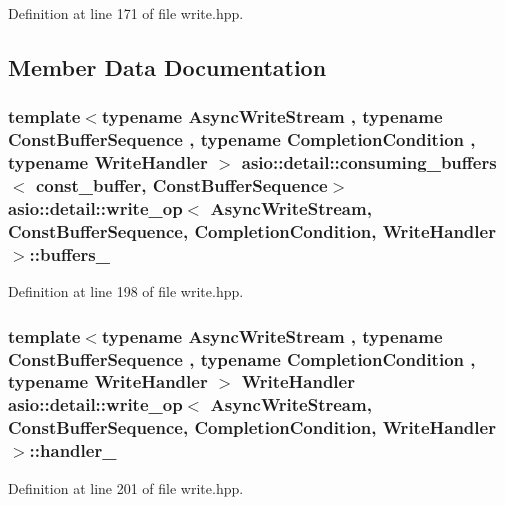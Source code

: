 Definition at line 171 of file write.\+hpp.



\subsection{Member Data Documentation}
\hypertarget{classasio_1_1detail_1_1write__op_a07e6662f88ca192db1446eebbcb77e3e}{}
\subsubsection[{buffers\+\_\+}]{\setlength{\rightskip}{0pt plus 5cm}template$<$typename Async\+Write\+Stream , typename Const\+Buffer\+Sequence , typename Completion\+Condition , typename Write\+Handler $>$ {\bf asio\+::detail\+::consuming\+\_\+buffers}$<$ {\bf const\+\_\+buffer}, Const\+Buffer\+Sequence$>$ {\bf asio\+::detail\+::write\+\_\+op}$<$ Async\+Write\+Stream, Const\+Buffer\+Sequence, Completion\+Condition, Write\+Handler $>$\+::buffers\+\_\+}\label{classasio_1_1detail_1_1write__op_a07e6662f88ca192db1446eebbcb77e3e}


Definition at line 198 of file write.\+hpp.

\hypertarget{classasio_1_1detail_1_1write__op_ae1b7226fd1d411ac3a126ca7698a81d9}{}
\subsubsection[{handler\+\_\+}]{\setlength{\rightskip}{0pt plus 5cm}template$<$typename Async\+Write\+Stream , typename Const\+Buffer\+Sequence , typename Completion\+Condition , typename Write\+Handler $>$ Write\+Handler {\bf asio\+::detail\+::write\+\_\+op}$<$ Async\+Write\+Stream, Const\+Buffer\+Sequence, Completion\+Condition, Write\+Handler $>$\+::handler\+\_\+}\label{classasio_1_1detail_1_1write__op_ae1b7226fd1d411ac3a126ca7698a81d9}


Definition at line 201 of file write.\+hpp.

\hypertarget{classasio_1_1detail_1_1write__op_abe9c4c673906b3a725db21a0089b0578}{}
